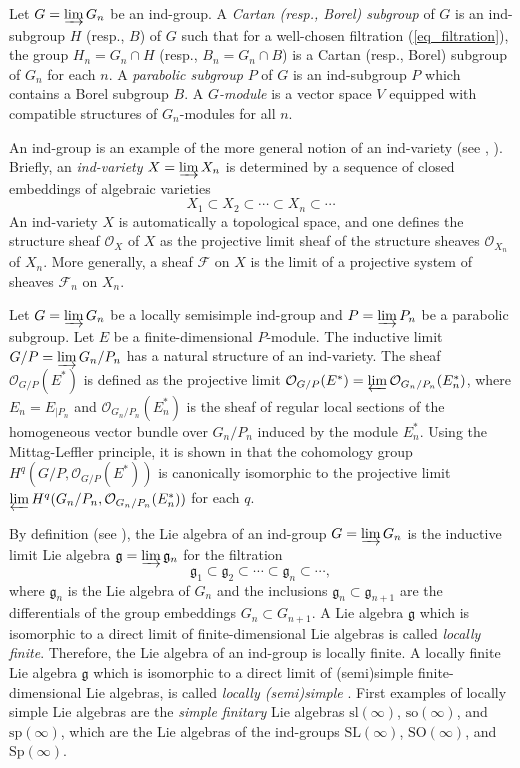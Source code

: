 \documentclass[12pt]{article}
\newcommand{\SL} {\mathrm{SL}}
\newcommand{\SO} {\mathrm{SO}}
\newcommand{\Sp} {\mathrm{Sp}}
\renewcommand{\sl} {\mathrm{sl}}
\newcommand{\so}   {\mathrm{so}}
\renewcommand{\sp}   {\mathrm{sp}}
\def \OO {{\mathcal O}}
\def \F {{\mathcal F}}
\def \g {\mathfrak{g}}
\begin{document}
Let $G = \varinjlim G_n$ be an ind-group. A \textit{Cartan (resp., Borel) subgroup} of $G$ is an ind-subgroup $H$ (resp., $B$) of $G$ such that for a well-chosen filtration (\ref{eq_filtration}), the group $H_n = G_n \cap H$ (resp., $B_n = G_n \cap B$) is a Cartan (resp., Borel) subgroup of $G_n$ for each $n$. A \textit{parabolic subgroup} $P$ of $G$ is an ind-subgroup $P$ which contains a Borel subgroup $B$. A \textit{$G$-module} is a vector space $V$ equipped with compatible structures of $G_n$-modules for all $n$.

An ind-group is an example of the more general notion of an ind-variety (see \cite{Ku}, \cite{DPW}). Briefly, an \textit{ind-variety} $X = \varinjlim X_n$ is determined by a sequence of closed embeddings of algebraic varieties
$$
X_1 \subset X_2 \subset \cdots \subset X_n \subset \cdots
$$
An ind-variety $X$ is automatically a topological space, and one defines the structure sheaf $\OO_X$ of $X$ as the projective limit sheaf of the structure sheaves $\OO_{X_n}$ of $X_n$. More generally, a sheaf $\F$ on $X$ is the limit of a projective system of sheaves $\F_n$ on $X_n$.

Let $G= \varinjlim G_n$ be a locally semisimple ind-group and $P = \varinjlim P_n$ be a parabolic subgroup. Let $E$ be a finite-dimensional $P$-module. %
The inductive limit $G/P = \varinjlim G_n /P_n$ has a natural structure of an ind-variety. The sheaf $\OO_{G/P}(E^*)$ is defined as the projective limit $\OO_{G/P}(E^*) = \varprojlim \OO_{G_n/P_n}(E_n^*)$, where $E_n = E_{\vert P_n}$ and $\OO_{G_n/P_n}(E_n^*)$ is the sheaf of regular local sections of the homogeneous vector bundle over $G_n/P_n$ induced by the module $E_n^*$. Using the Mittag-Leffler principle, it is shown in \cite{DPW} that the cohomology group $H^q(G/P, \OO_{G/P}(E^*))$ is canonically isomorphic to the projective limit $\varprojlim H^{q}(G_n/P_n, \OO_{G_n/P_n}(E_n^*))$ for each $q$.

By definition (see \cite{DPW}), the Lie algebra of an ind-group $G = \varinjlim G_n$ is the inductive limit Lie algebra $\g = \varinjlim \g_n$ for the filtration
$$
\g_1 \subset \g_2 \subset \cdots \subset \g_n \subset \cdots,
$$
where $\g_n$ is the Lie algebra of $G_n$ and the inclusions $\g_n \subset \g_{n+1}$ are the differentials of the group embeddings $G_n \subset G_{n+1}$. A Lie algebra $\g$ which is isomorphic to a direct limit of finite-dimensional Lie algebras is called \textit{locally finite}. Therefore, the Lie algebra of an ind-group is locally finite. A locally finite Lie algebra $\g$ which is isomorphic to a direct limit of (semi)simple %
finite-dimensional Lie algebras, is called \textit{locally (semi)simple}%
. First examples of locally simple Lie algebras are the \textit{simple finitary} Lie algebras $\sl(\infty)$, $\so(\infty)$, and $\sp(\infty)$, which are the Lie algebras of the ind-groups $\SL(\infty)$, $\SO(\infty)$, and $\Sp(\infty)$. 
\end{document}
